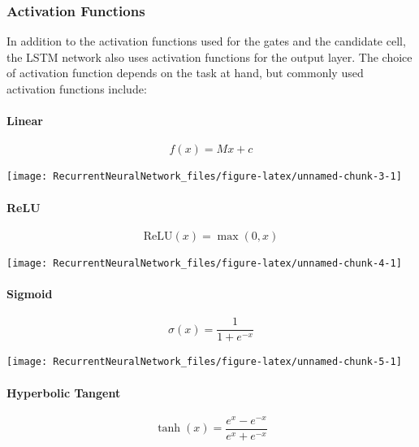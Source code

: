 \documentclass[
]{article}
\begin{document}
\hypertarget{activation-functions}{%
\subsubsection{Activation Functions}\label{activation-functions}}

In addition to the activation functions used for the gates and the
candidate cell, the LSTM network also uses activation functions for the
output layer. The choice of activation function depends on the task at
hand, but commonly used activation functions include:

\hypertarget{linear}{%
\paragraph{Linear}\label{linear}}

\[ f(x) = Mx + c \]

\begin{center}\texttt{[image: RecurrentNeuralNetwork\_files/figure-latex/unnamed-chunk-3-1]} \end{center}

\hypertarget{relu}{%
\paragraph{ReLU}\label{relu}}

\[ \text{ReLU}(x) = \max(0, x) \]

\begin{center}\texttt{[image: RecurrentNeuralNetwork\_files/figure-latex/unnamed-chunk-4-1]} \end{center}

\hypertarget{sigmoid}{%
\paragraph{Sigmoid}\label{sigmoid}}

\[ \sigma(x) = \frac{1}{1 + e^{-x}} \]

\begin{center}\texttt{[image: RecurrentNeuralNetwork\_files/figure-latex/unnamed-chunk-5-1]} \end{center}

\hypertarget{hyperbolic-tangent}{%
\paragraph{Hyperbolic Tangent}\label{hyperbolic-tangent}}

\[ \tanh(x) = \frac{e^x - e^{-x}}{e^x + e^{-x}} \]
\end{document}
